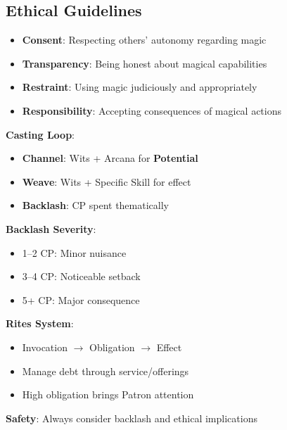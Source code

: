 \begin{multicols}{2}
\subsection*{Ethical Guidelines}
\begin{itemize}
\item \textbf{Consent}: Respecting others' autonomy regarding magic
\item \textbf{Transparency}: Being honest about magical capabilities
\item \textbf{Restraint}: Using magic judiciously and appropriately
\item \textbf{Responsibility}: Accepting consequences of magical actions
\end{itemize}

\begin{tcolorbox}[colback=purple!5!white,colframe=purple!75!black,title=Magic Quick Reference,fonttitle=\bfseries]
\textbf{Casting Loop}:
\begin{itemize}
\item \textbf{Channel}: Wits + Arcana for \textbf{Potential}
\item \textbf{Weave}: Wits + Specific Skill for effect
\item \textbf{Backlash}: CP spent thematically
\end{itemize}

\textbf{Backlash Severity}:
\begin{itemize}
\item 1--2 CP: Minor nuisance
\item 3--4 CP: Noticeable setback
\item 5+ CP: Major consequence
\end{itemize}

\textbf{Rites System}:
\begin{itemize}
\item Invocation $\rightarrow$ Obligation $\rightarrow$ Effect
\item Manage debt through service/offerings
\item High obligation brings Patron attention
\end{itemize}

\textbf{Safety}: Always consider backlash and ethical implications
\end{tcolorbox}


\end{multicols}
